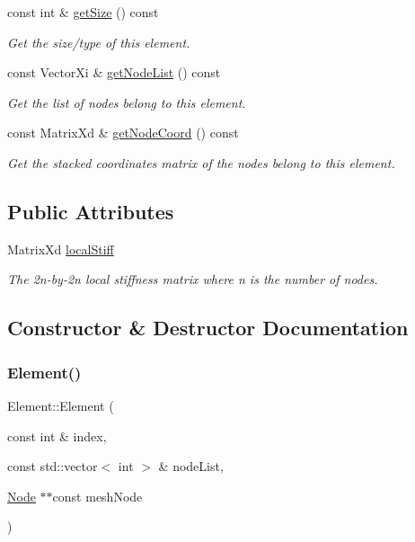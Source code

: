\begin{DoxyCompactItemize}
$$const int \& \mbox{\hyperlink{class_element_a0221b246d9ca632136cc39790c46ee8f}{get\+Size}} () const
\begin{DoxyCompactList}\small\item\em Get the size/type of this element. \end{DoxyCompactList}\item 
const Vector\+Xi \& \mbox{\hyperlink{class_element_a763e0e4a46e68823903557a605dc5474}{get\+Node\+List}} () const
\begin{DoxyCompactList}\small\item\em Get the list of nodes belong to this element. \end{DoxyCompactList}\item 
const Matrix\+Xd \& \mbox{\hyperlink{class_element_a4d12b24e62592a1456e04d15872d5240}{get\+Node\+Coord}} () const
\begin{DoxyCompactList}\small\item\em Get the stacked coordinates matrix of the nodes belong to this element. \end{DoxyCompactList}\end{DoxyCompactItemize}
\subsection*{Public Attributes}
\begin{DoxyCompactItemize}
\item 
\mbox{\label{class_element_adb81184f683d1eebb5b3a28887ff8df4}} 
Matrix\+Xd \mbox{\hyperlink{class_element_adb81184f683d1eebb5b3a28887ff8df4}{local\+Stiff}}
\begin{DoxyCompactList}\small\item\em The 2n-\/by-\/2n local stiffness matrix where n is the number of nodes. \end{DoxyCompactList}\end{DoxyCompactItemize}


\subsection{Constructor \& Destructor Documentation}
\mbox{\label{class_element_a05c744ed2de597b38da74c7765f5ed1b}} 
\subsubsection{\texorpdfstring{Element()}{Element()}}
{\footnotesize\ttfamily Element\+::\+Element (\begin{DoxyParamCaption}\item[{const int \&}]{index,  }\item[{const std\+::vector$<$ int $>$ \&}]{node\+List,  }\item[{\mbox{\hyperlink{class_node}{Node}} $\ast$$\ast$const}]{mesh\+Node }\end{DoxyParamCaption})}



